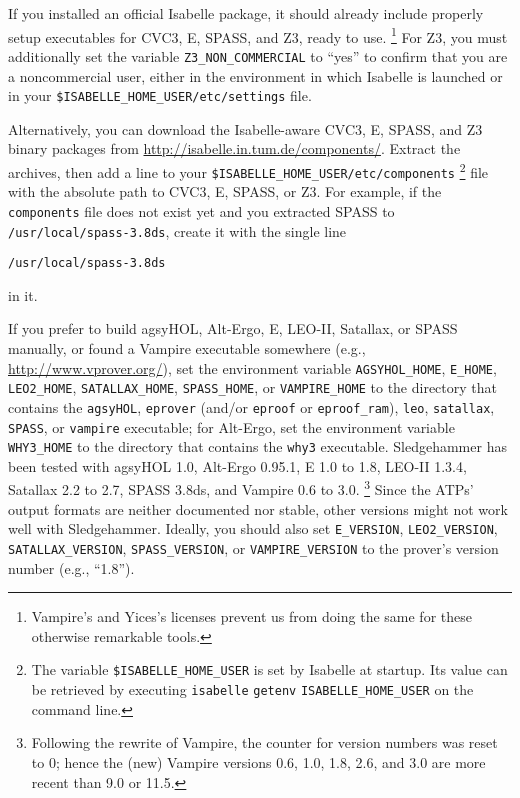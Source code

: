\documentclass[a4paper,12pt]{article}
\newcommand\download{\url{http://isabelle.in.tum.de/components/}}
\begin{document}
\begin{sloppy}
\begin{enum}
\item[\labelitemi] If you installed an official Isabelle package, it should
already include properly setup executables for CVC3, E, SPASS, and Z3, ready to use.%
\footnote{Vampire's and Yices's licenses prevent us from doing the same for
these otherwise remarkable tools.}
For Z3, you must additionally set the variable
\texttt{Z3\_NON\_COMMERCIAL} to ``yes'' to confirm that you are a
noncommercial user, either in the environment in which Isabelle is
launched or in your
\texttt{\$ISABELLE\_HOME\_USER/etc/settings} file.

\item[\labelitemi] Alternatively, you can download the Isabelle-aware CVC3, E,
SPASS, and Z3 binary packages from \download. Extract the archives, then add a
line to your \texttt{\$ISABELLE\_HOME\_USER\slash etc\slash components}%
\footnote{The variable \texttt{\$ISABELLE\_HOME\_USER} is set by Isabelle at
startup. Its value can be retrieved by executing \texttt{isabelle}
\texttt{getenv} \texttt{ISABELLE\_HOME\_USER} on the command line.}
file with the absolute path to CVC3, E, SPASS, or Z3. For example, if the
\texttt{components} file does not exist yet and you extracted SPASS to
\texttt{/usr/local/spass-3.8ds}, create it with the single line

\prew
\texttt{/usr/local/spass-3.8ds}
\postw

in it.

\item[\labelitemi] If you prefer to build agsyHOL, Alt-Ergo, E, LEO-II,
Satallax, or SPASS manually, or found a Vampire executable somewhere (e.g.,
\url{http://www.vprover.org/}), set the environment variable
\texttt{AGSYHOL\_HOME}, \texttt{E\_HOME}, \texttt{LEO2\_HOME},
\texttt{SATALLAX\_HOME}, \texttt{SPASS\_HOME}, or
\texttt{VAMPIRE\_HOME} to the directory that contains the \texttt{agsyHOL},
\texttt{eprover} (and/or \texttt{eproof} or \texttt{eproof\_ram}),
\texttt{leo}, \texttt{satallax}, \texttt{SPASS}, or \texttt{vampire} executable;
for Alt-Ergo, set the
environment variable \texttt{WHY3\_HOME} to the directory that contains the
\texttt{why3} executable.
Sledgehammer has been tested with agsyHOL 1.0, Alt-Ergo 0.95.1, E 1.0 to 1.8,
LEO-II 1.3.4, Satallax 2.2 to 2.7, SPASS 3.8ds, and Vampire 0.6 to 3.0.%
\footnote{Following the rewrite of Vampire, the counter for version numbers was
reset to 0; hence the (new) Vampire versions 0.6, 1.0, 1.8, 2.6, and 3.0 are more
recent than 9.0 or 11.5.}%
Since the ATPs' output formats are neither documented nor stable, other
versions might not work well with Sledgehammer. Ideally,
you should also set \texttt{E\_VERSION}, \texttt{LEO2\_VERSION},
\texttt{SATALLAX\_VERSION}, \texttt{SPASS\_VERSION}, or
\texttt{VAMPIRE\_VERSION} to the prover's version number (e.g., ``1.8'').


\end{enum}
\end{sloppy}
\end{document}
